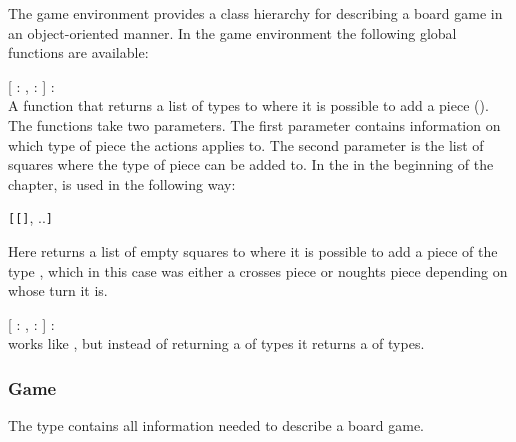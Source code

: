 The game environment provides a class hierarchy for describing a board game in
an object-oriented manner. In the game environment the following global
functions are available:

\begin{dlist}
  \item {}[ : ,  : ] : \\
    A function that returns a list of  types to where it is possible
    to add a piece (). The functions take two parameters. The
    first parameter contains information on which type of piece the actions
    applies to. The second parameter is the list of squares where the type of
    piece can be added to. 
    In the  in the beginning of the chapter,
     is used in the following way:
    
    \begin{center}
      \texttt{[}\texttt{[}\texttt{]},
      ..\texttt{]}
    \end{center}
    
    Here  returns a list of empty squares to where it is
    possible to add a piece of the type , which in this case was
    either a crosses piece or noughts piece depending on whose turn it is.
    
  \item {}[ : ,  : ] : \\
     works like , but instead of
    returning a  of  types it returns a  of
     types.
\end{dlist}

\subsubsection{Game}
The  type contains all information needed to describe a board game. 

